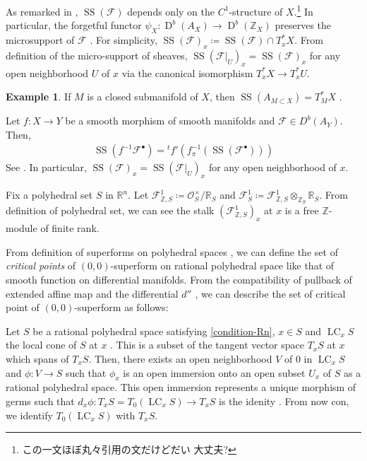 \documentclass[a4paper,dvipdfmx,reqno,12pt]{amsart}
\theoremstyle{definition}
\newtheorem{example}[theorem]{Example}
\newcommand{\deq}{\coloneqq}
\newcommand{\Z}{\mathbb{Z}}%
\newcommand{\mcal}[1]{\mathcal{#1}}%
\newcommand{\opn}[1]{\operatorname{#1}}
\numberwithin{equation}{section}
\begin{document}
As remarked in \cite[Remark 5.1.6]{MR1299726},
$\opn{SS}(\mcal{F})$ depends only on the 
$C^{1}$-structure of $X$.\footnote{この一文ほぼ丸々引用の文だけどだい
大丈夫?}
In particular, 
the forgetful functor 
$\psi_X \colon \opn{D}^{b}(A_X)\to \opn{D}^{b}(\Z_X)$
preserves the microsupport of $\mcal{F}$ 
\cite[Remark 5.1.5]{MR1299726}.
For simplicity,
$\opn{SS}(\mcal{F})_x\deq \opn{SS}(\mcal{F}) \cap T^{*}_x X$.
From definition of the micro-support of sheaves, 
$\opn{SS}(\mcal{F}|_{U})_x=\opn{SS}(\mcal{F})_x$
for any open neighborhood $U$ of $x$ via the canonical 
isomorphism $T^{*}_xX\to T^{*}_xU$.

\begin{example}
If $M$ is a closed submanifold of $X$, then
$\opn{SS}(A_{M\subset X})=T^{*}_M X$ \cite[Proposition 5.3.2]{MR1299726}.
\end{example}
Let $f\colon X \to Y$ be a smooth morphism of 
smooth manifolds and $\mathcal{F}\in 
D^{b}(A_Y)$. Then,
\begin{align}
\opn{SS}(f^{-1}\mathcal{F}^{\bullet})=
{}^{t}f'(f_\pi^{-1}(\opn{SS}(\mathcal{F}^{\bullet})))
\end{align}
See \cite[Proposition 5.4.5 (i)]{MR1299726}.
In particular, 
$\opn{SS}(\mathcal{F})_x=\opn{SS}(\mathcal{F}|_U)_x$
for any open neighborhood of $x$.

Fix a polyhedral set $S$ 
in $\mathbb{R}^{n}$.
Let 
$\mathcal{F}^{1}_{\mathbb{Z},S}
\deq \mathcal{O}^{\times}_S/\mathbb{R}_{S}$
and 
$\mathcal{F}^{1}_{S}\deq 
\mathcal{F}^{1}_{\mathbb{Z},S}
\otimes_{\mathbb{Z}_S} \mathbb{R}_S$.
From definition of polyhedral set, 
we can see 
the stalk $(\mathcal{F}^{1}_{\mathbb{Z},S})_x$
at $x$ is a free 
$\mathbb{Z}$-module of finite rank.

From definition of superforms on 
polyhedral spaces 
\cite[Definition 2.10, 2.24]{MR3903579}, we 
can define the set of \emph{critical points} 
of $(0,0)$-superform on rational polyhedral space
like that of smooth function on differential
manifolds.
From the compatibility of pullback of extended
affine map and the differential $d''$
\cite[Lemma 2.21]{MR3903579}, we can 
describe the set of critical point of 
$(0,0)$-superform as follows:

Let $S$ be a rational polyhedral space satisfying
\cref{condition-Rn}, $x\in S$ and $\opn{LC}_x S$ the 
local cone of $S$ at $x$ 
\cite[2.2]{gross2019sheaftheoretic}.
This is a subset of the tangent vector space
$T_{x}S$ at $x$ which spans of $T_{x}S$.
Then, there exists an open neighborhood 
$V$ of $0$ in $\opn{LC}_x S$ and $\phi \colon V\to S$ 
such that $\phi_x$ is an open immersion onto an 
open subset $U_x$ of $S$ as a 
rational polyhedral space.
This open immersion represents a unique morphism
of germs such that $d_x\phi\colon T_x S=T_0(\opn{LC}_xS) \to T_x S$
is the idenity 
\cite[Proposition 2.5]{gross2019sheaftheoretic}.
From now con, we identify 
$T_0(\opn{LC}_x S)$ with $T_x S$.
\end{document}
